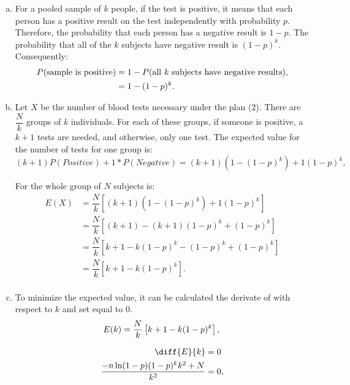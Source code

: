 \documentclass[10pt,leter,openany]{article}
\begin{document}
\begin{enumerate}[(a)]
	\item For a pooled sample of $ k $ people, if the test is positive, it means that each person has a positive result on the test independently with probability $p$. Therefore, the probability that each person has a negative result is $1-p$. The probability that all of the $k$ subjects have negative result is $ (1-p)^{k} $. Consequently:
	\begin{equation*}
		\begin{aligned}
			P(\mbox{sample is positive}) & = 1- P(\mbox{all \textit{k} subjects have negative results}),\\
			& = 1-(1-p)^{k}.\\
		\end{aligned}	
	\end{equation*}

\item Let $X$ be the number of blood tests necessary under the plan (2). There are $\dfrac{N}{k} $ groups of $ k $ individuals. For each of these groups, if someone is positive, a $k+1$ tests are needed, and otherwise, only one test. The expected value for the number of tests for one group is:
\begin{equation*}
	(k+1)P(Positive) + 1*P(Negative) = (k+1)(1-(1-p)^k) + 1(1-p)^k,
\end{equation*}

For the whole group of $ N $ subjects is:
\begin{equation*}
	\begin{aligned}
		E(X) & = \dfrac{N}{k}\left[ (k+1)(1-(1-p)^k) + 1(1-p)^k\right] \\
		& = \dfrac{N}{k}\left[ (k+1)-(k+1)(1-p)^k + (1-p)^k\right]\\
		& = \dfrac{N}{k}\left[ k+1-k(1-p)^k - (1-p)^k + (1-p)^k \right]\\
		& = \dfrac{N}{k}\left[ k+1-k(1-p)^k\right].\\
	\end{aligned}	
\end{equation*}

\item To minimize the expected value, it can be calculated the derivate of with respect to $ k $ and set equal to 0.
\begin{equation*}
E(k)	= \dfrac{N}{k}\left[ k+1-k(1-p)^k\right],\\
\end{equation*}

\begin{equation*}
	\begin{aligned}
	\diff{E}{k}& = 0\\
	\dfrac{-n\ln(1-p)(1-p)^k k^2+N}{k^2}& = 0,
\end{aligned}	
\end{equation*}


\end{enumerate}
\end{document}
